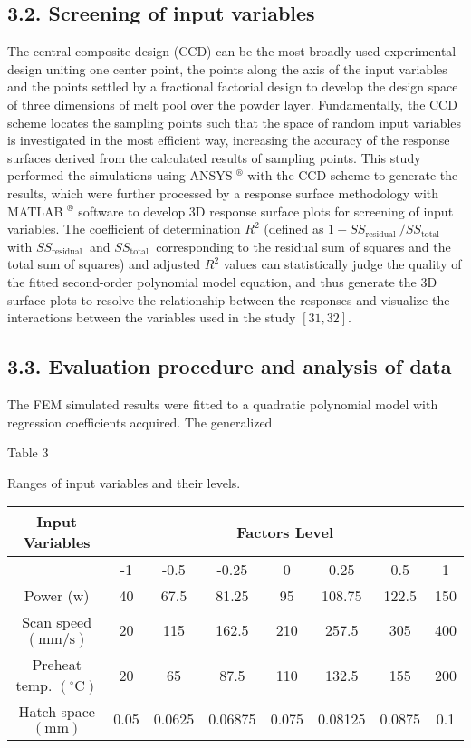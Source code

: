 \documentclass[10pt]{article}
\begin{document}
\subsection*{3.2. Screening of input variables}
The central composite design (CCD) can be the most broadly used experimental design uniting one center point, the points along the axis of the input variables and the points settled by a fractional factorial design to develop the design space of three dimensions of melt pool over the powder layer. Fundamentally, the CCD scheme locates the sampling points such that the space of random input variables is investigated in the most efficient way, increasing the accuracy of the response surfaces derived from the calculated results of sampling points. This study performed the simulations using ANSYS ${ }^{\circledR}$ with the CCD scheme to generate the results, which were further processed by a response surface methodology with MATLAB ${ }^{\circledR}$ software to develop 3D response surface plots for screening of input variables. The coefficient of determination $R^{2}$ (defined as $1-S S_{\text {residual }} / S S_{\text {total }}$ with $S S_{\text {residual }}$ and $S S_{\text {total }}$ corresponding to the residual sum of squares and the total sum of squares) and adjusted $R^{2}$ values can statistically judge the quality of the fitted second-order polynomial model equation, and thus generate the 3D surface plots to resolve the relationship between the responses and visualize the interactions between the variables used in the study $[31,32]$.

\subsection*{3.3. Evaluation procedure and analysis of data}
The FEM simulated results were fitted to a quadratic polynomial model with regression coefficients acquired. The generalized

Table 3

Ranges of input variables and their levels.

\begin{center}
\begin{tabular}{|c|c|c|c|c|c|c|c|}
\hline
\multirow[t]{2}{*}{Input Variables} & \multicolumn{7}{|c|}{Factors Level} \\
\hline
 & -1 & -0.5 & -0.25 & 0 & 0.25 & 0.5 & 1 \\
\hline
Power (w) & 40 & 67.5 & 81.25 & 95 & 108.75 & 122.5 & 150 \\
\hline
Scan speed $(\mathrm{mm} / \mathrm{s})$ & 20 & 115 & 162.5 & 210 & 257.5 & 305 & 400 \\
\hline
Preheat temp. $\left({ }^{\circ} \mathrm{C}\right)$ & 20 & 65 & 87.5 & 110 & 132.5 & 155 & 200 \\
\hline
Hatch space $(\mathrm{mm})$ & 0.05 & 0.0625 & 0.06875 & 0.075 & 0.08125 & 0.0875 & 0.1 \\
\hline
\end{tabular}
\end{center}
\end{document}
